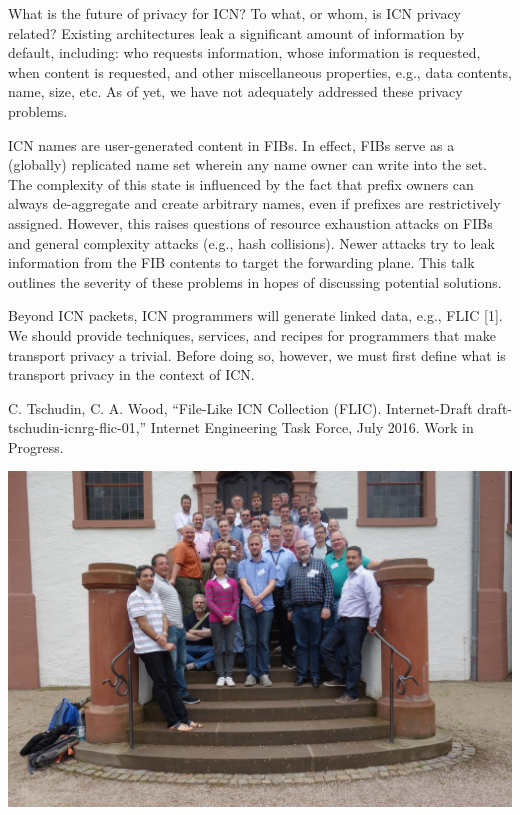 \documentclass[a4paper,UKenglish]{dagrep}
\begin{document}
What is the future of privacy for ICN? To what, or whom, is ICN privacy related? Existing architectures leak a significant amount of information by default, including: who requests information, whose information is requested, when content is requested, and other miscellaneous properties, e.g., data contents, name, size, etc. As of yet, we have not adequately addressed these privacy problems.

\license

ICN names are user-generated content in FIBs. In effect, FIBs serve as a (globally) replicated name set wherein any name owner can write into the set. The complexity of this state is influenced by the fact that prefix owners can always de-aggregate and create arbitrary names, even if prefixes are restrictively assigned. However, this raises questions of resource exhaustion attacks on FIBs and general complexity attacks (e.g., hash collisions). Newer attacks try to leak information from the FIB contents to target the forwarding plane. This talk outlines the severity of these problems in hopes of discussing potential solutions.

\license

Beyond ICN packets, ICN programmers will generate linked data, e.g., FLIC [1]. We should provide techniques, services, and recipes for programmers that make transport privacy a trivial. Before doing so, however, we must first define what is transport privacy in the context of ICN.

\begin{thebibliography}{0}
\bibitem{[1]} C. Tschudin, C. A. Wood, ``File-Like ICN Collection (FLIC). Internet-Draft draft-tschudin-icnrg-flic-01,'' Internet Engineering Task Force, July 2016. Work in Progress.
\end{thebibliography}


\vfill

\begin{center}
\includegraphics[width=1.0\textwidth]{16251.jpg}
\end{center}
\end{document}
